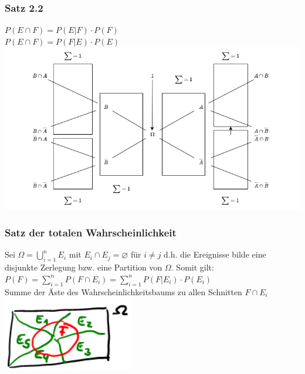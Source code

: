  \subsubsection{Satz 2.2}
  $P(E \cap F) = P(E|F) \cdot P(F)$\\
  $P(E \cap F) = P(F|E) \cdot P(E)$\\
  	\includegraphics[scale=0.2]{./pic/BedingteWahrscheinlichkeit.png}
  	\subsubsection{Satz der totalen Wahrscheinlichkeit}
  	Sei $\Omega = \bigcup_{i=1}^{n} E_{i}$ mit $E_{i} \cap E_{j} =  \varnothing$ für $i \ne j$ d.h. die Ereignisse bilde eine disjunkte Zerlegung bzw. eine Partition von $\Omega$. Somit gilt:\\
  	$P(F) = \sum_{i=1}^{n} P(F \cap E_{i}) = \sum_{i=1}^{n} P(F|E_{i}) \cdot P(E_{i})$\\
  	Summe der Äste des Wahrscheinlichkeitsbaums zu allen Schnitten $F \cap E_{i}$
  	\includegraphics[scale=0.25]{./pic/SatzTotalerWahrscheinlichkeit.png}
